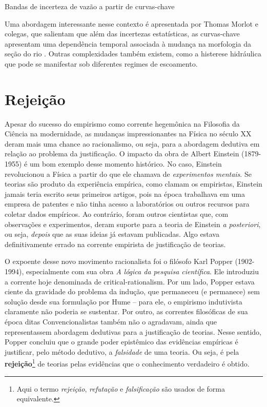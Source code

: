 \documentclass[./main.tex]{subfiles}
\begin{document}
\begin{simplebox}[
    float=htb,
    label={destaque_curvas_chave},
    nameref={Curvas-chave}
    ]{Bandas de incerteza de vazão a partir de curvas-chave}
\begin{minipage}[t]{\linewidth}
    \par Uma abordagem interessante nesse contexto é apresentada por Thomas Morlot e colegas, que salientam que além das incertezas estatísticas, as curvas-chave apresentam uma dependência temporal associada à mudança na morfologia da seção do rio \cite{Morlot2014}. Outras complexidades também existem, como a histerese hidráulica que pode se manifestar sob diferentes regimes de escoamento.    
    \end{minipage}
\label{box:rating-curve}
\normalsize
\end{simplebox}

\section{Rejeição} \label{sec:epis:popper}

\par Apesar do sucesso do empirismo como corrente hegemônica na Filosofia da Ciência na modernidade, as mudanças impressionantes na Física no século XX deram mais uma chance ao racionalismo, ou seja, para a abordagem dedutiva em relação ao problema da justificação. O impacto da obra de Albert Einstein (1879-1955) é um bom exemplo desse momento histórico. No caso, Einstein revolucionou a Física a partir do que ele chamava de \textit{experimentos mentais}. Se teorias são produto da experiência empírica, como clamam os empiristas, Einstein jamais teria escrito seus primeiros artigos, pois na época trabalhava em uma empresa de patentes e não tinha acesso a laboratórios ou outros recursos para coletar dados empíricos. Ao contrário, foram outros cientistas que, com observações e experimentos, deram suporte para a teoria de Einstein \textit{a posteriori}, ou seja, \textit{depois} que as suas ideias já estavam publicadas. Algo estava definitivamente errado na corrente empirista de justificação de teorias.

\par O expoente desse novo movimento racionalista foi o filósofo Karl Popper (1902-1994), especialmente com sua obra \textit{A lógica da pesquisa científica}. Ele introduziu a corrente hoje denominada de \gls{critical-rationalism}. Por um lado, Popper estava ciente da gravidade do problema da indução, que permaneceu (e permanece) sem solução desde sua formulação por Hume – para ele, o empirismo indutivista claramente não poderia se sustentar. Por outro, as correntes filosóficas de sua época ditas Convencionalistas também não o agradavam, ainda que representassem abordagem dedutivas para a justificação de teorias. Nesse sentido, Popper concluiu que o grande poder epistêmico das evidências empíricas é justificar, pelo método dedutivo, a \textit{falsidade} de uma teoria. Ou seja, é pela \textbf{rejeição}\footnote{Aqui o termo \textit{rejeição}, \textit{refutação} e \textit{falsificação} são usados de forma equivalente.} de teorias pelas evidências que o conhecimento verdadeiro é obtido.
\end{document}
